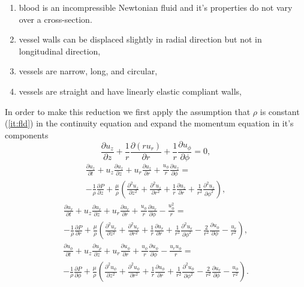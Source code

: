 \documentclass[a4paper, oneside]{discothesis}
\begin{document}
\begin{enumerate}
	\item blood is an incompressible Newtonian fluid and it's properties do not vary over a cross-section. \label{it:fld} 
	\item vessel walls can be displaced slightly in radial direction but not in longitudinal direction, \label{it:displ} 
	\item vessels are narrow, long, and circular, \label{it:nlc}
	\item vessels are straight and have linearly elastic compliant walls, \label{it:lec}
\end{enumerate}
In order to make this reduction we first apply the assumption that $\rho$ is constant (\autoref{it:fld}) in the continuity equation and expand the momentum equation in it's components
\begin{equation}
	\frac{\partial u_z}{\partial z} + \frac{1}{r} \frac{\partial (ru_r)}{\partial r} + \frac{1}{r}\frac{\partial u_\phi}{\partial \phi} = 0, 
\end{equation}
\begin{multline}
	\frac{\partial u_z}{\partial t} + u_z \frac{\partial u_z}{\partial z} + u_r \frac{\partial u_z}{\partial r} + \frac{u_\phi}{r}\frac{\partial u_z}{\partial \phi} = \\
	-\frac{1}{\rho}\frac{\partial P}{\partial z} + \frac{\mu}{\rho} \left( \frac{\partial^2 u_z}{\partial z^2} + \frac{\partial^2 u_z}{\partial r^2} + \frac{1}{r} \frac{\partial u_z}{\partial r} + \frac{1}{r^2}\frac{\partial^2 u_z}{\partial \phi^2} \right), 
\end{multline}
\begin{multline}
	\frac{\partial u_r}{\partial t} + u_z \frac{\partial u_r}{\partial z} + u_r \frac{\partial u_r}{\partial r} + \frac{u_\phi}{r}\frac{\partial u_r}{\partial \phi} -\frac{u_\phi^2}{r} = \\
	-\frac{1}{\rho}\frac{\partial P}{\partial r} + \frac{\mu}{\rho} \left( \frac{\partial^2 u_r}{\partial z^2} + \frac{\partial^2 u_r}{\partial r^2} + \frac{1}{r} \frac{\partial u_r}{\partial r} + \frac{1}{r^2}\frac{\partial^2 u_r}{\partial \phi^2} -\frac{2}{r^2}\frac{\partial u_\phi}{\partial \phi} - \frac{u_r}{r^2} \right), 
\end{multline}
\begin{multline}
	\frac{\partial u_\phi}{\partial t} + u_z \frac{\partial u_\rho}{\partial z} + u_r \frac{\partial u_\phi}{\partial r} + \frac{u_\phi}{r}\frac{\partial u_\phi}{\partial \phi} -\frac{u_r u_\phi}{r} = \\
	-\frac{1}{\rho}\frac{\partial P}{\partial \phi} + \frac{\mu}{\rho} \left( \frac{\partial^2 u_\phi}{\partial z^2} + \frac{\partial^2 u_\phi}{\partial r^2} + \frac{1}{r} \frac{\partial u_\phi}{\partial r} + \frac{1}{r^2}\frac{\partial^2 u_\phi}{\partial \phi^2} -\frac{2}{r^2}\frac{\partial u_r}{\partial \phi} - \frac{u_\phi}{r^2}\right). \label{eq:momp}
\end{multline}
\end{document}
